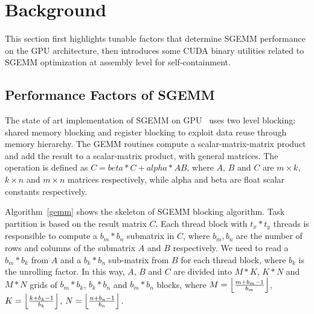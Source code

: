 \section{Background}
\label{sec:background}

This section first highlights tunable factors that determine SGEMM performance on the GPU architecture, then introduces some CUDA binary utilities related to SGEMM optimization at assembly level for self-containment. 


\subsection{Performance Factors of SGEMM}
\label{sec:sgemm}
The state of art implementation of SGEMM on GPU~\cite{magma,nervana_sgemm_wiki,lai,tan} uses two level blocking:
shared memory blocking and register blocking to exploit data reuse through memory hierarchy.
The GEMM routines compute a scalar-matrix-matrix product and add the result to
a scalar-matrix product, with general matrices. The operation is defined as $C
= beta*C + alpha*AB$, where $A$, $B$ and $C$ are $m\times k$, $k\times n$ and
$m\times n$ matrices respectively, while alpha and beta are float scalar constants respectively.

Algorithm~\ref{gemm} shows the skeleton of SGEMM blocking algorithm. Task partition is based on the result matrix $C$. 
Each thread block with $t_x*t_y$ threads is responsible to compute a $b_m*b_n$ submatrix in $C$, where $b_m, b_n$ are the 
number of rows and columns of the submatrix $A$ and $B$ respectively. We need to read a $b_m*b_k$ from $A$ and a $b_k*b_n$ sub-matrix from 
$B$ for each thread block, where $b_k$ is the unrolling factor. In this way, $A$, $B$ and $C$ are divided into $M*K$, $K*N$ and 
$M*N$ grids of $b_m*b_k$, $b_k*b_n$ and $b_m*b_n$ blocks, where $M=\Bigl\lfloor \frac{m+b_m-1}{b_m} \Bigr\rfloor$, 
$K=\Bigl\lfloor \frac{k+b_k-1}{b_k} \Bigr\rfloor$, $N=\Bigl\lfloor \frac{n+b_n-1}{b_n} \Bigr\rfloor$.

